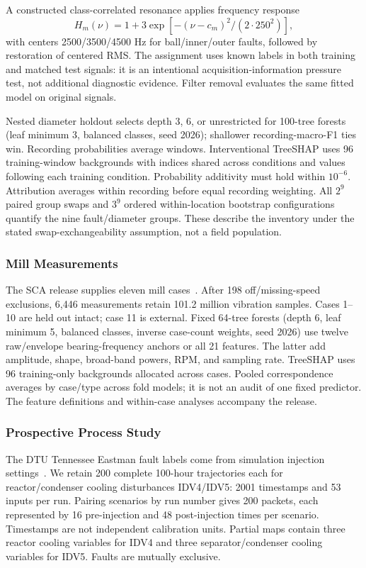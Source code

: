 \documentclass[conference]{IEEEtran}
\begin{document}
A constructed class-correlated resonance applies frequency response
\begin{equation}
 H_m(\nu)=1+3\exp[-(\nu-c_m)^2/(2\cdot250^2)],
\end{equation}
with centers 2500/3500/4500 Hz for ball/inner/outer faults, followed by restoration of centered RMS. The assignment uses known labels in both training and matched test signals: it is an intentional acquisition-information pressure test, not additional diagnostic evidence. Filter removal evaluates the same fitted model on original signals.

Nested diameter holdout selects depth 3, 6, or unrestricted for 100-tree forests (leaf minimum 3, balanced classes, seed 2026); shallower recording-macro-F1 ties win. Recording probabilities average windows. Interventional TreeSHAP uses 96 training-window backgrounds with indices shared across conditions and values following each training condition. Probability additivity must hold within $10^{-6}$. Attribution averages within recording before equal recording weighting. All $2^9$ paired group swaps and $3^9$ ordered within-location bootstrap configurations quantify the nine fault/diameter groups. These describe the inventory under the stated swap-exchangeability assumption, not a field population.

\subsubsection{Mill Measurements}
The SCA release supplies eleven mill cases~\cite{lundstrom2023factory,sca2024}. After 198 off/missing-speed exclusions, 6,446 measurements retain 101.2 million vibration samples. Cases 1--10 are held out intact; case 11 is external. Fixed 64-tree forests (depth 6, leaf minimum 5, balanced classes, inverse case-count weights, seed 2026) use twelve raw/envelope bearing-frequency anchors or all 21 features. The latter add amplitude, shape, broad-band powers, RPM, and sampling rate. TreeSHAP uses 96 training-only backgrounds allocated across cases. Pooled correspondence averages by case/type across fold models; it is not an audit of one fixed predictor. The feature definitions and within-case analyses accompany the release.

\subsubsection{Prospective Process Study}
The DTU Tennessee Eastman fault labels come from simulation injection settings~\cite{reinartz2021tep,reinartz2021data}. We retain 200 complete 100-hour trajectories each for reactor/condenser cooling disturbances IDV4/IDV5: 2001 timestamps and 53 inputs per run. Pairing scenarios by run number gives 200 packets, each represented by 16 pre-injection and 48 post-injection times per scenario. Timestamps are not independent calibration units. Partial maps contain three reactor cooling variables for IDV4 and three separator/condenser cooling variables for IDV5. Faults are mutually exclusive.
\end{document}
